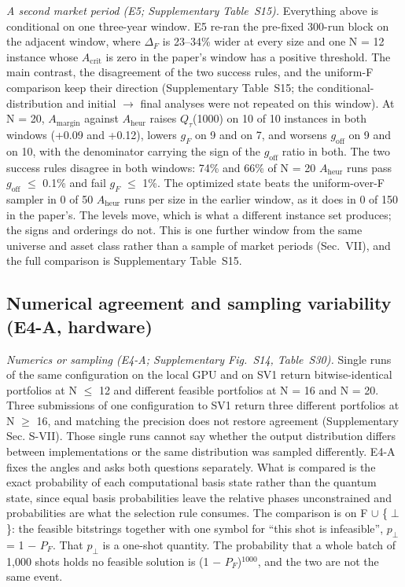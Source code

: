 \documentclass{ieeeaccess}
\begin{document}
\textit{A second market period (E5; Supplementary Table~S15).} Everything above is conditional on one three-year window. E5 re-ran the pre-fixed 300-run block on the adjacent window, where $\Delta_{F}$ is 23--34\% wider at every size and one N = 12 instance whose $A_{\mathrm{crit}}$ is zero in the paper's window has a positive threshold. The main contrast, the disagreement of the two success rules, and the uniform-F comparison keep their direction (Supplementary Table~S15; the conditional-distribution and initial $\rightarrow$ final analyses were not repeated on this window). At N = 20, $A_{\mathrm{margin}}$ against $A_{\mathrm{heur}}$ raises $Q_{\tau}$(1000) on 10 of 10 instances in both windows (+0.09 and +0.12), lowers $g_{F}$ on 9 and on 7, and worsens $g_{\mathrm{off}}$ on 9 and on 10, with the denominator carrying the sign of the $g_{\mathrm{off}}$ ratio in both. The two success rules disagree in both windows: 74\% and 66\% of N = 20 $A_{\mathrm{heur}}$ runs pass $g_{\mathrm{off}}$ $\leq$ 0.1\% and fail $g_{F}$ $\leq$ 1\%. The optimized state beats the uniform-over-F sampler in 0 of 50 $A_{\mathrm{heur}}$ runs per size in the earlier window, as it does in 0 of 150 in the paper's. The levels move, which is what a different instance set produces; the signs and orderings do not. This is one further window from the same universe and asset class rather than a sample of market periods (Sec.~VII), and the full comparison is Supplementary Table~S15.


\subsection{Numerical agreement and sampling variability (E4-A, hardware)}


\textit{Numerics or sampling (E4-A; Supplementary Fig.~S14, Table~S30).} Single runs of the same configuration on the local GPU and on SV1 return bitwise-identical portfolios at N $\leq$ 12 and different feasible portfolios at N = 16 and N = 20. Three submissions of one configuration to SV1 return three different portfolios at N $\geq$ 16, and matching the precision does not restore agreement (Supplementary Sec. S-VII). Those single runs cannot say whether the output distribution differs between implementations or the same distribution was sampled differently. E4-A fixes the angles and asks both questions separately. What is compared is the exact probability of each computational basis state rather than the quantum state, since equal basis probabilities leave the relative phases unconstrained and probabilities are what the selection rule consumes. The comparison is on F $\cup$ \{$\perp$\}: the feasible bitstrings together with one symbol for ``this shot is infeasible'', $p_{\perp}$ = 1 $-$ $P_{F}$. That $p_{\perp}$ is a one-shot quantity. The probability that a whole batch of 1,000 shots holds no feasible solution is (1 $-$ $P_{F}$)$^{1000}$, and the two are not the same event.
\end{document}
